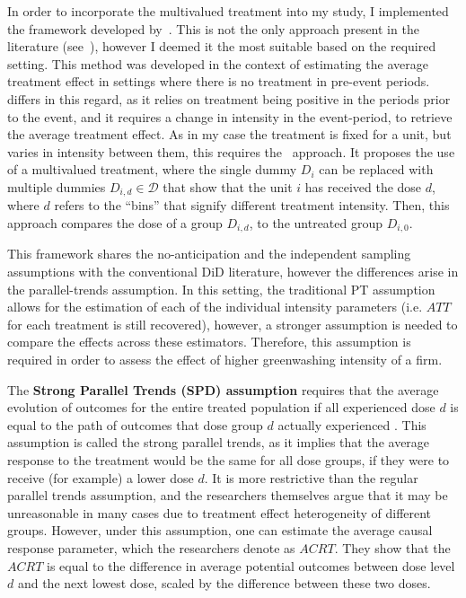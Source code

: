 \documentclass[12pt]{article}
\begin{document}
In order to incorporate the multivalued treatment into my study, I implemented the framework developed by~\textcite{callawayDifferenceinDifferencesContinuousTreatment2025}. This is not the only approach present in the literature (see~\cite{dechaisemartinDifferenceinDifferenceEstimatorsContinuous2024}), however I deemed it the most suitable based on the required setting. This method was developed in the context of estimating the average treatment effect in settings where there is no treatment in pre-event periods.\@ \citeauthor{dechaisemartinDifferenceinDifferenceEstimatorsContinuous2024} differs in this regard, as it relies on treatment being positive in the periods prior to the event, and it requires a change in intensity in the event-period, to retrieve the average treatment effect. As in my case the treatment is fixed for a unit, but varies in intensity between them, this requires the~\textcite{callawayDifferenceinDifferencesContinuousTreatment2025} approach. It proposes the use of a multivalued treatment, where the single dummy $D_i$ can be replaced with multiple dummies $D_{i,d} \in \mathcal{D}$ that show that the unit $i$ has received the dose $d$, where $d$ refers to the ``bins'' that signify different treatment intensity. Then, this approach compares the dose of a group $D_{i,d}$, to the untreated group $D_{i,0}$.

This framework shares the no-anticipation and the independent sampling assumptions with the conventional DiD literature, however the differences arise in the parallel-trends assumption. In this setting, the traditional PT assumption allows for the estimation of each of the individual intensity parameters (i.e. $ATT$ for each treatment is still recovered), however, a stronger assumption is needed to compare the effects across these estimators. Therefore, this assumption is required in order to assess the effect of higher greenwashing intensity of a firm.  

The \textbf{Strong Parallel Trends (SPD) assumption} requires that the average evolution of  outcomes for the entire treated population if all experienced dose $d$ is equal to the path of outcomes that dose group $d$ actually experienced \parencite{callawayDifferenceinDifferencesContinuousTreatment2025}. This assumption is called the strong parallel trends, as it implies that the average response to the treatment would be the same for all dose groups, if they were to receive (for example) a lower dose $d$. It is more restrictive than the regular parallel trends assumption, and the researchers themselves argue that it may be unreasonable in many cases due to treatment effect heterogeneity of different groups. However, under this assumption, one can estimate the average causal response parameter, which the researchers denote as $ACRT$. They show that the $ACRT$ is equal to the difference in average potential outcomes between dose level $d$ and the next lowest dose, scaled by the difference between these two doses. 
\end{document}
